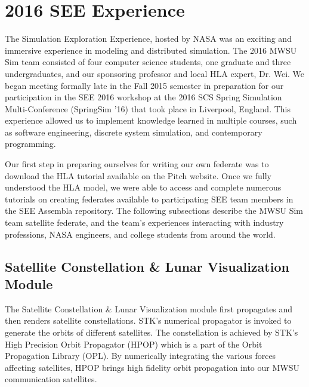 \documentclass[conference]{IEEEtran}
\begin{document}
\section{2016 SEE Experience}
The Simulation Exploration Experience, hosted by NASA was an exciting and immersive experience in modeling and distributed simulation.  The 2016 MWSU Sim team consisted of four computer science students, one graduate and three undergraduates, and our sponsoring professor and local HLA expert, Dr. Wei.  We began meeting formally late in the Fall 2015 semester in preparation for our participation in the SEE 2016 workshop at the 2016 SCS Spring Simulation Multi-Conference (SpringSim '16) that took place in Liverpool, England.  This experience allowed us to implement knowledge learned in multiple courses, such as software engineering, discrete system simulation, and contemporary programming.

Our first step in preparing ourselves for writing our own federate was to download the HLA tutorial available on the Pitch website\cite{HLA}.  Once we fully understood the HLA model, we were able to access and complete numerous tutorials on creating federates available to participating SEE team members in the SEE Assembla repository. The following subsections describe the MWSU Sim team satellite federate, and the team's experiences interacting with industry professions, NASA engineers, and college students from around the world.

\subsection{Satellite Constellation \& Lunar Visualization Module}
The Satellite Constellation \& Lunar Visualization module first propagates and then renders satellite constellations. STK\rq{}s numerical propagator is invoked to generate the orbits of different satellites. The constellation is achieved by STK\rq{}s High Precision Orbit Propagator (HPOP) which is a part of the Orbit Propagation Library (OPL). By numerically integrating the various forces affecting satellites, HPOP brings high fidelity orbit propagation into our MWSU communication satellites.
\end{document}
